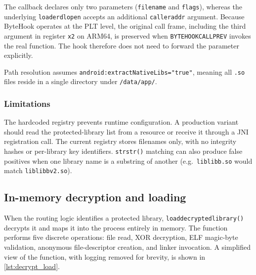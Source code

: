 \documentclass[11pt,a4paper]{report}
\renewcommand\_{{\textunderscore\allowbreak}}
\begin{document}
The callback declares only two parameters (\texttt{filename} and \texttt{flags}), whereas the underlying \linebreak \texttt{\_\_loader\_dlopen} accepts an additional \texttt{caller\_addr} argument.  Because ByteHook operates at the PLT level, the original call frame, including the third argument in register \texttt{x2} on ARM64, is preserved when \texttt{BYTEHOOK\_CALL\_PREV} invokes the real function. The hook therefore does not need to forward the parameter explicitly.

Path resolution assumes \texttt{android:extractNativeLibs="true"}, meaning all \texttt{.so} files reside in a single directory under \texttt{/data/app/}.

\subsubsection{Limitations}
\label{sec:routing_limits}

The hardcoded registry prevents runtime configuration.  A production variant should read the protected-library list from a resource or receive it through a JNI registration call.  The current registry stores filenames only, with no integrity hashes or per-library key identifiers.  \texttt{strstr()} matching can also produce false positives when one library name is a substring of another (e.g.\ \texttt{liblibb.so} would match \texttt{liblibb\_v2.so}).

\subsection{In-memory decryption and loading}

When the routing logic identifies a protected library, \texttt{load\_decrypted\_library()} decrypts it and maps it into the process entirely in memory.  The function performs five discrete operations: file read, XOR decryption, ELF magic-byte validation, anonymous file-descriptor creation, and linker invocation.  A simplified view of the function, with logging removed for brevity, is shown in \cref{lst:decrypt_load}.
\end{document}
